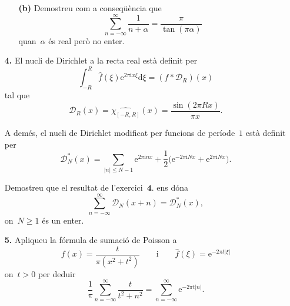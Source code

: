 \documentclass[a4paper]{article}
\theoremstyle{plain}
\newcommand{\iu}{\mathrm{i}}
\newcommand{\e}{\mathrm{e}}
\providecommand{\uppi}{\pi}
\newcommand{\diff}{\mathrm{d}}
\newcommand{\abs}[1]{\lvert{#1}\rvert}
\newcommand{\D}{\mathcal{D}}
\begin{document}
\begin{enumerate}
    \item[]\begin{enumerate}
        \item[\textbf{(b)}] Demostreu com a conseqüència que
            \begin{equation}
                \label{eq3b}
                \sum_{n=-\infty}^{\infty} \frac{1}{n+\alpha}
                = \frac{\uppi}{\tan(\uppi\alpha)}
            \end{equation}
            quan~\(\alpha\) és real però no enter.
    \end{enumerate}
\end{enumerate}

\begin{enumerate}
    \item[\textbf{4.}] El nucli de Dirichlet a la recta real està definit per
        \[
            \int_{-R}^{R}\widehat{f}(\xi)\e^{2\uppi\iu x\xi}\diff\xi
            = (f\ast \D_{R})(x)
        \]
        tal que
        \[
            \D_{R}(x) = \widehat{\chi_{[-R,R]}}(x)
            = \frac{\sin(2\uppi Rx)}{\uppi x}.
        \]

        A demés, el nucli de Dirichlet modificat per funcions de període~\(1\)
        està definit per
        \[
            \D^{\ast}_{N}(x)
            = \sum_{\abs{n} \leq N-1} \e^{2\uppi\iu nx}
            + \frac{1}{2}\bigl(\e^{-2\uppi\iu Nx} + \e^{2\uppi\iu Nx}\bigr).
        \]

        Demostreu que el resultat de l'exercici~\(\textbf{4.}\) ens dóna
        \[
            \sum_{n=-\infty}^{\infty} \D_{N}(x+n) = \D^{\ast}_{N}(x),
        \]
        on~\(N\geq1\) és un enter.
\end{enumerate}

\begin{enumerate}
    \item[\textbf{5.}] Apliqueu la fórmula de sumació de Poisson a
        \[
            f(x) = \frac{t}{\uppi(x^{2}+t^{2})}
            \qquad
            \text{i}
            \qquad
            \widehat{f}(\xi) = \e^{-2\uppi t\abs{\xi}}
        \]
        on~\(t>0\) per deduir
        \[
            \frac{1}{\uppi}
            \sum_{n=-\infty}^{\infty}
            \frac{t}{t^{2}+n^{2}}
            =
            \sum_{n=-\infty}^{\infty}
            \e^{-2\uppi t\abs{n}}.
        \]
\end{enumerate}
\end{document}
